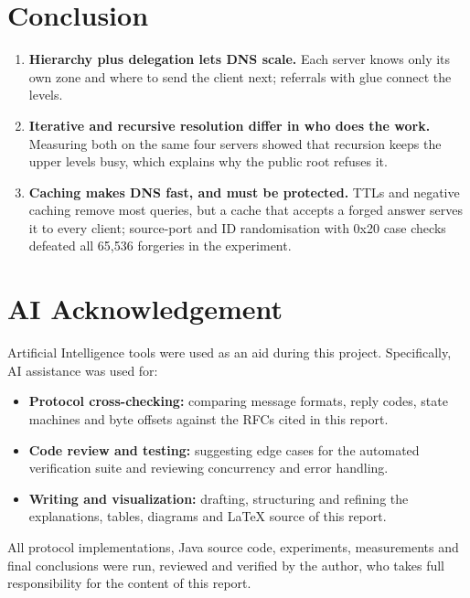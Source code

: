 \documentclass[11pt,a4paper]{article}
\begin{document}
\section{Conclusion}
\begin{enumerate}[leftmargin=2em]
    \item \textbf{Hierarchy plus delegation lets DNS scale.} Each server knows only its own zone and where to send the client next; referrals with glue connect the levels.
    \item \textbf{Iterative and recursive resolution differ in who does the work.} Measuring both on the same four servers showed that recursion keeps the upper levels busy, which explains why the public root refuses it.
    \item \textbf{Caching makes DNS fast, and must be protected.} TTLs and negative caching remove most queries, but a cache that accepts a forged answer serves it to every client; source-port and ID randomisation with 0x20 case checks defeated all 65,536 forgeries in the experiment.
\end{enumerate}

\section*{AI Acknowledgement}
Artificial Intelligence tools were used as an aid during this project. Specifically, AI assistance was used for:
\begin{itemize}[leftmargin=2em]
    \item \textbf{Protocol cross-checking:} comparing message formats, reply codes, state machines and byte offsets against the RFCs cited in this report.
    \item \textbf{Code review and testing:} suggesting edge cases for the automated verification suite and reviewing concurrency and error handling.
    \item \textbf{Writing and visualization:} drafting, structuring and refining the explanations, tables, diagrams and \LaTeX{} source of this report.
\end{itemize}
All protocol implementations, Java source code, experiments, measurements and final conclusions were run, reviewed and verified by the author, who takes full responsibility for the content of this report.
\end{document}
